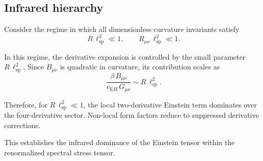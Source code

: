 \subsection{Infrared hierarchy}
  \label{subsec:ir-hierarchy}

  Consider the regime in which all dimensionless curvature invariants satisfy
  \begin{equation}
    R\,\ell_{\mathrm{sp}}^2 \ll 1,
    \qquad
    R_{\mu\nu}\,\ell_{\mathrm{sp}}^2 \ll 1.
  \end{equation}

  In this regime, the derivative expansion is controlled by the small
  parameter $R\,\ell_{\mathrm{sp}}^2$.
  Since $B_{\mu\nu}$ is quadratic in curvature,
  its contribution scales as
  \begin{equation}
    \frac{\beta\, B_{\mu\nu}}{c_{\mathrm EH}\, G_{\mu\nu}}
    \sim
    R\,\ell_{\mathrm{sp}}^2 .
  \end{equation}

  Therefore, for $R\,\ell_{\mathrm{sp}}^2 \ll 1$,
  the local two-derivative Einstein term dominates over the
  four-derivative sector.
  Non-local form factors reduce to suppressed derivative corrections.

  This establishes the infrared dominance of the Einstein tensor
  within the renormalized spectral stress tensor.
